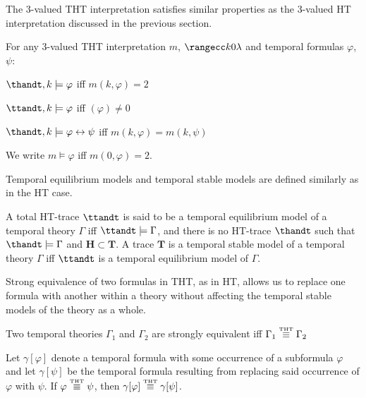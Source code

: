 The 3-valued THT interpretation satisfies similar properties as the
3-valued HT interpretation discussed in the previous section.

\begin{proposition}
  For any 3-valued THT interpretation $m$, $\kinlambda$ and temporal
  formulas $\varphi$, $\psi$:
\begin{description}
  \item $\thandt,k \models \varphi$ iff $m(k,\varphi) = 2$
  \item $\ttandt,k \models \varphi$ iff $(\varphi) \neq 0$
  \item $\thandt,k \models \varphi \leftrightarrow \psi$ iff $m(k,\varphi) = m(k,\psi)$
\end{description}
\end{proposition}

We write $m \models \varphi$ iff $m(0,\varphi)=2$.

Temporal equilibrium models and temporal stable models are defined
similarly as in the HT case.

\begin{definition}
  A total HT-trace $\ttandt$ is said to be a temporal equilibrium
  model of a temporal theory $\Gamma$ iff $\ttandt \models \Gamma$,
  and there is no HT-trace $\thandt$ such that $\thandt \models \Gamma$ and
  $\bm{H} \subset \bm{T}$. A trace $\bm{T}$ is a temporal stable model of a temporal theory $\Gamma$ iff
  $\ttandt$ is a temporal equilibrium model of $\Gamma$.
\end{definition}

Strong equivalence of two formulas in THT, as in HT, allows us to
replace one formula with another within a theory without affecting the
temporal stable models of the theory as a whole.

\begin{proposition}
  Two temporal theories $\Gamma_1$ and $\Gamma_2$ are strongly equivalent
  iff $\Gamma_1 \stackrel{\normalfont\mbox{\tiny THT}}{\equiv} \Gamma_2$
\end{proposition}

\begin{proposition}
  Let $\gamma[\varphi]$ denote a temporal formula with some occurrence of a
  subformula $\varphi$ and let $\gamma[\psi]$ be the temporal formula resulting
  from replacing said occurrence of $\varphi$ with $\psi$. If
  $\varphi \stackrel{\normalfont\mbox{\tiny THT}}{\equiv} \psi$, then $\gamma[\varphi] \stackrel{\normalfont\mbox{\tiny THT}}{\equiv} \gamma[\psi]$.
\end{proposition}